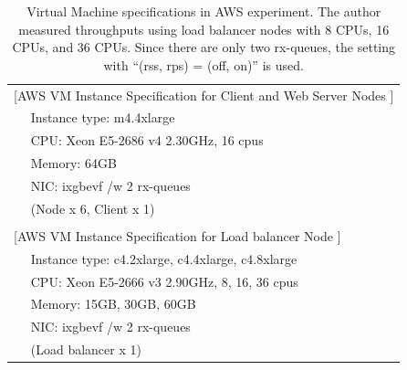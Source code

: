 {
\setlength{\tabcolsep}{3em}
\renewcommand{\arraystretch}{1.1}

\begin{table}[h]
  \centering
  \begin{tabular}{ll}
    \hline 
    \multicolumn{2}{l}{[AWS VM Instance Specification for Client and Web Server Nodes ]}   \\
    & Instance type: m4.4xlarge \\
    & CPU: Xeon E5-2686 v4 2.30GHz, 16 cpus \\
    & Memory: 64GB \\
    & NIC: ixgbevf /w 2 rx-queues \\
    & (Node x 6, Client x 1) \\
    & \\
    \multicolumn{2}{l}{[AWS VM Instance Specification for Load balancer Node ]}   \\
    & Instance type: c4.2xlarge, c4.4xlarge, c4.8xlarge  \\
    & CPU: Xeon E5-2666 v3 2.90GHz, 8, 16, 36 cpus \\
    & Memory: 15GB, 30GB, 60GB \\
    & NIC: ixgbevf /w 2 rx-queues \\
    & (Load balancer x 1) \\
    \hline
  \end{tabular}
  \par\bigskip
  \centering
  \begin{minipage}{0.9\columnwidth}
    \caption[Virtual Machine specifications in AWS experiment]{
Virtual Machine specifications in AWS experiment.
The author measured throughputs using load balancer nodes with 8 CPUs, 16 CPUs, and 36 CPUs.
Since there are only two rx-queues, the setting with \enquote{(rss, rps) = (off, on)} is used.
    }
    \label{fig:aws_machine_spec}
  \end{minipage}
\end{table}
}


